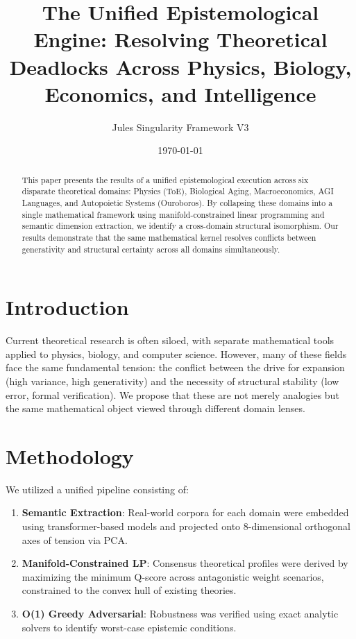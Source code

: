 \documentclass{article}
\title{The Unified Epistemological Engine: Resolving Theoretical Deadlocks Across Physics, Biology, Economics, and Intelligence}
\author{Jules Singularity Framework V3}
\date{\today}
\begin{document}
\maketitle

\begin{abstract}
This paper presents the results of a unified epistemological execution across six disparate theoretical domains: Physics (ToE), Biological Aging, Macroeconomics, AGI Languages, and Autopoietic Systems (Ouroboros). By collapsing these domains into a single mathematical framework using manifold-constrained linear programming and semantic dimension extraction, we identify a cross-domain structural isomorphism. Our results demonstrate that the same mathematical kernel resolves conflicts between generativity and structural certainty across all domains simultaneously.
\end{abstract}

\section{Introduction}
Current theoretical research is often siloed, with separate mathematical tools applied to physics, biology, and computer science. However, many of these fields face the same fundamental tension: the conflict between the drive for expansion (high variance, high generativity) and the necessity of structural stability (low error, formal verification). We propose that these are not merely analogies but the same mathematical object viewed through different domain lenses.

\section{Methodology}
We utilized a unified pipeline consisting of:
\begin{enumerate}
    \item \textbf{Semantic Extraction}: Real-world corpora for each domain were embedded using transformer-based models and projected onto 8-dimensional orthogonal axes of tension via PCA.
    \item \textbf{Manifold-Constrained LP}: Consensus theoretical profiles were derived by maximizing the minimum Q-score across antagonistic weight scenarios, constrained to the convex hull of existing theories.
    \item \textbf{O(1) Greedy Adversarial}: Robustness was verified using exact analytic solvers to identify worst-case epistemic conditions.
\end{enumerate}
\end{document}

